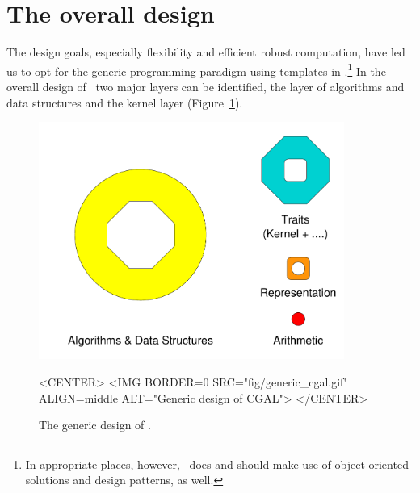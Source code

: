 
\section{The overall design}
\label{sec:overall_design}

The design goals, especially flexibility and efficient robust 
computation, have led us to opt for the generic programming paradigm using 
templates in \CC.\footnote{In appropriate places, however, \cgal\ does 
and should make use of object-oriented solutions and design patterns, as well.}
In the overall design of \cgal\ two major layers can be identified, the
layer of algorithms and data structures and the kernel layer
(Figure~\ref{fig:genericCGAL}).

\begin{figure}
\begin{ccTexOnly}
\begin{center}
  \includegraphics[width=10cm]{Developers_manual/fig/generic_cgal}
\end{center}
\end{ccTexOnly}
\caption{The generic design of \cgal.
\label{fig:genericCGAL}}

\begin{ccHtmlOnly}
<CENTER>
<IMG BORDER=0 SRC="fig/generic_cgal.gif" 
  ALIGN=middle ALT="Generic design of CGAL">
</CENTER>
\end{ccHtmlOnly}
\end{figure}

